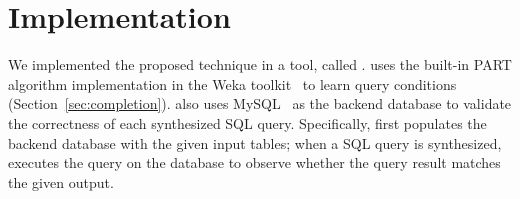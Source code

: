 
\section{Implementation}
\label{sec:implementation}

We implemented the proposed technique in a tool, called \ourtool. 
\ourtool uses the built-in PART algorithm implementation in
the Weka toolkit~\cite{Hall:2009} to learn query conditions
(Section~\ref{sec:completion}). \ourtool also uses
MySQL~\cite{mysql} as the backend
database to validate the correctness of each synthesized 
SQL query. Specifically, \ourtool first populates the backend database
with the given input tables; when a SQL query is
synthesized, \ourtool executes the query on the database
to observe whether the query result matches the given output.
